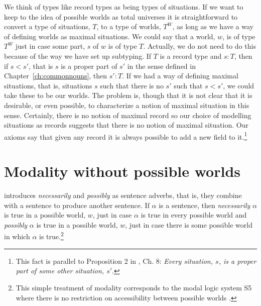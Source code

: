 We think of types like record types as being types of
situations.  If we want to keep to the idea of possible worlds as
total universes it is straightforward to convert a type of situations, $T$,
to a type of worlds, $T^W$, as long as we have a way of defining
worlds as maximal situations.  We could say that a world, $w$, is of
type $T^W$ just in case some part, $s$ of $w$ is of type $T$.
Actually, we do not need to do this because of the way we have set up
subtyping.  If $T$ is a record type and $s:T$, then if $s<s'$, that is
$s$ is a proper part of $s'$ in the sense defined in
Chapter~\ref{ch:commonnouns}, then $s':T$.  If we had a way of
defining maximal situations, that is, situations $s$ such that there
is no $s'$ such that $s<s'$, we could take these to be our worlds.
The problem is, though that it
is not clear that it is desirable, or even possible, to characterize a
notion of maximal situation in this sense.  Certainly, there is no
notion of maximal record so our choice of modelling situations as
records suggests that there is no notion of maximal situation.  Our axioms say that given any record it is
always possible to add a new field to it.\footnote{This fact is
  parallel to Proposition 2 in \cite{Barwise1989}, Ch. 8:
  \textit{Every situation, $s$, is a proper part of some other
    situation, $s'$}.}  





\section{Modality without possible worlds}

\cite{Montague1973} introduces \textit{necessarily} and
\textit{possibly} as sentence adverbs, that is, they combine with a
sentence to produce another sentence. If $\alpha$ is a sentence, then
\textit{necessarily} $\alpha$ is true in a possible world, $w$, just in case $\alpha$ is true in
every possible world and \textit{possibly} $\alpha$ is true in a
possible world, $w$, just in case there is some possible world in
which $\alpha$ is true.\footnote{This simple treatment of modality
  corresponds to the modal logic system S5 where there is no
  restriction on accessibility between possible worlds
  \citep{HughesCresswel1968,HughesCresswell1996}.}

